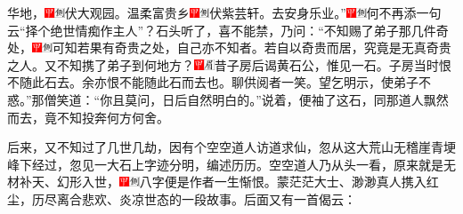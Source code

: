 华地，{\includegraphics[width=3mm]{../Images/00002}\includegraphics[width=3mm]{../Images/00011}\footnotesize \kaishu 伏大观园。}温柔富贵乡{\includegraphics[width=3mm]{../Images/00002}\includegraphics[width=3mm]{../Images/00011}\footnotesize \kaishu 伏紫芸轩。}去安身乐业。''{\includegraphics[width=3mm]{../Images/00002}\includegraphics[width=3mm]{../Images/00011}\footnotesize \kaishu 何不再添一句云``择个绝世情痴作主人''？}石头听了，喜不能禁，乃问：``不知赐了弟子那几件奇处，{\includegraphics[width=3mm]{../Images/00002}\includegraphics[width=3mm]{../Images/00011}\footnotesize \kaishu 可知若果有奇贵之处，自己亦不知者。若自以奇贵而居，究竟是无真奇贵之人。}又不知携了弟子到何地方？{\includegraphics[width=3mm]{../Images/00002}\includegraphics[width=3mm]{../Images/00010}\footnotesize \kaishu 昔子房后谒黄石公，惟见一石。子房当时恨不随此石去。余亦恨不能随此石而去也。聊供阅者一笑。}望乞明示，使弟子不惑。''那僧笑道：``你且莫问，日后自然明白的。''说着，便袖了这石，同那道人飘然而去，竟不知投奔何方何舍。

后来，又不知过了几世几劫，因有个空空道人访道求仙，忽从这大荒山无稽崖青埂峰下经过，忽见一大石上字迹分明，编述历历。空空道人乃从头一看，原来就是无材补天、幻形入世，{\includegraphics[width=3mm]{../Images/00002}\includegraphics[width=3mm]{../Images/00011}\footnotesize \kaishu 八字便是作者一生惭恨。}蒙茫茫大士、渺渺真人携入红尘，历尽离合悲欢、炎凉世态的一段故事。后面又有一首偈云：

